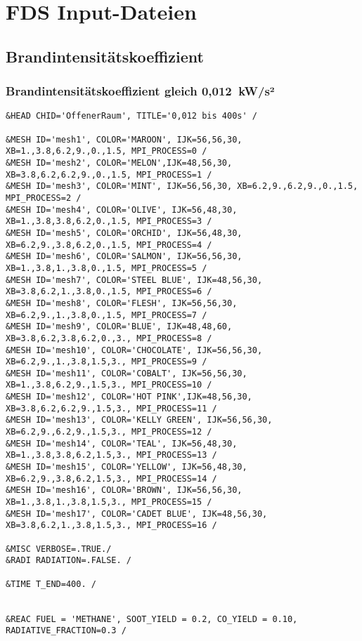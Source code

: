 \chapter{FDS Input-Dateien}
\label{ch:InputDateien}

\section{Brandintensitätskoeffizient}
\subsection*{Brandintensitätskoeffizient gleich 0,012~kW/s²}
\begin{lstlisting}[emptylines=0,basicstyle=\tiny]
&HEAD CHID='OffenerRaum', TITLE='0,012 bis 400s' /

&MESH ID='mesh1', COLOR='MAROON', IJK=56,56,30, XB=1.,3.8,6.2,9.,0.,1.5, MPI_PROCESS=0 /
&MESH ID='mesh2', COLOR='MELON',IJK=48,56,30, XB=3.8,6.2,6.2,9.,0.,1.5, MPI_PROCESS=1 /
&MESH ID='mesh3', COLOR='MINT', IJK=56,56,30, XB=6.2,9.,6.2,9.,0.,1.5, MPI_PROCESS=2 /
&MESH ID='mesh4', COLOR='OLIVE', IJK=56,48,30, XB=1.,3.8,3.8,6.2,0.,1.5, MPI_PROCESS=3 /
&MESH ID='mesh5', COLOR='ORCHID', IJK=56,48,30, XB=6.2,9.,3.8,6.2,0.,1.5, MPI_PROCESS=4 /
&MESH ID='mesh6', COLOR='SALMON', IJK=56,56,30, XB=1.,3.8,1.,3.8,0.,1.5, MPI_PROCESS=5 /
&MESH ID='mesh7', COLOR='STEEL BLUE', IJK=48,56,30, XB=3.8,6.2,1.,3.8,0.,1.5, MPI_PROCESS=6 /
&MESH ID='mesh8', COLOR='FLESH', IJK=56,56,30, XB=6.2,9.,1.,3.8,0.,1.5, MPI_PROCESS=7 /
&MESH ID='mesh9', COLOR='BLUE', IJK=48,48,60, XB=3.8,6.2,3.8,6.2,0.,3., MPI_PROCESS=8 /
&MESH ID='mesh10', COLOR='CHOCOLATE', IJK=56,56,30, XB=6.2,9.,1.,3.8,1.5,3., MPI_PROCESS=9 /
&MESH ID='mesh11', COLOR='COBALT', IJK=56,56,30, XB=1.,3.8,6.2,9.,1.5,3., MPI_PROCESS=10 /
&MESH ID='mesh12', COLOR='HOT PINK',IJK=48,56,30, XB=3.8,6.2,6.2,9.,1.5,3., MPI_PROCESS=11 /
&MESH ID='mesh13', COLOR='KELLY GREEN', IJK=56,56,30, XB=6.2,9.,6.2,9.,1.5,3., MPI_PROCESS=12 /
&MESH ID='mesh14', COLOR='TEAL', IJK=56,48,30, XB=1.,3.8,3.8,6.2,1.5,3., MPI_PROCESS=13 /
&MESH ID='mesh15', COLOR='YELLOW', IJK=56,48,30, XB=6.2,9.,3.8,6.2,1.5,3., MPI_PROCESS=14 /
&MESH ID='mesh16', COLOR='BROWN', IJK=56,56,30, XB=1.,3.8,1.,3.8,1.5,3., MPI_PROCESS=15 /
&MESH ID='mesh17', COLOR='CADET BLUE', IJK=48,56,30, XB=3.8,6.2,1.,3.8,1.5,3., MPI_PROCESS=16 /

&MISC VERBOSE=.TRUE./
&RADI RADIATION=.FALSE. /

&TIME T_END=400. /


&REAC FUEL = 'METHANE', SOOT_YIELD = 0.2, CO_YIELD = 0.10, RADIATIVE_FRACTION=0.3 /


\end{lstlisting}
